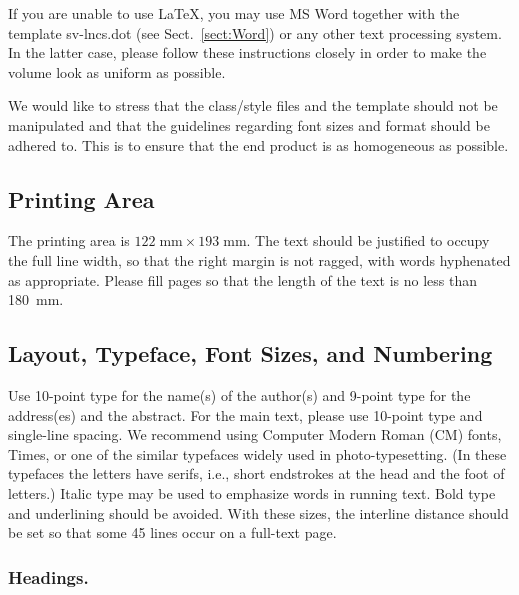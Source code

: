 \documentclass[runningheads]{llncs}
\begin{document}
If you are unable to use \LaTeX, you may use MS Word together with the
template sv-lncs.dot (see Sect.~\ref{sect:Word}) or any other text
processing system. In the latter case, please follow
these instructions closely in order to make the volume
look as uniform as possible.

We would like to stress that the class/style files and the template
should not be manipulated and that the guidelines regarding font sizes
and format should be adhered to. This is to ensure that the end product
is as homogeneous as possible.


\subsection{Printing Area}
The printing area is $122  \; \mbox{mm} \times 193 \;
\mbox{mm}$.
The text should be justified to occupy the full line width,
so that the right margin is not ragged, with words hyphenated as
appropriate. Please fill pages so that the length of the text
is no less than 180~mm.

\subsection{Layout, Typeface, Font Sizes, and Numbering}
Use 10-point type for the name(s) of the author(s) and 9-point type for
the address(es) and the abstract. For the main text, please use 10-point
type and single-line spacing.
We recommend using Computer Modern Roman (CM) fonts, Times, or one
of the similar typefaces widely used in photo-typesetting.
(In these typefaces the letters have serifs, i.e., short endstrokes at
the head and the foot of letters.)
Italic type may be used to emphasize words in running text. Bold
type and underlining should be avoided.
With these sizes, the interline distance should be set so that some 45
lines occur on a full-text page.

\subsubsection{Headings.}
\end{document}
